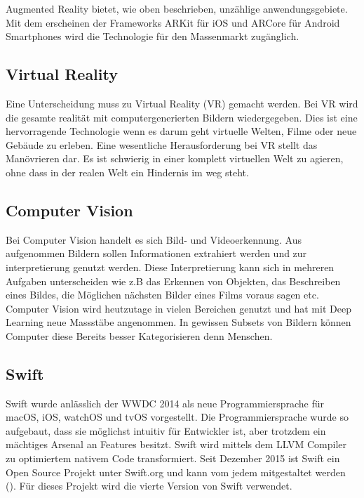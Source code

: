 Augmented Reality bietet, wie oben beschrieben, unzählige anwendungsgebiete. Mit dem erscheinen der Frameworks ARKit für iOS und ARCore für Android Smartphones wird die Technologie für den Massenmarkt zugänglich.

\subsection{Virtual Reality} \label{sub:virtual-reality}
Eine Unterscheidung muss zu Virtual Reality (VR) gemacht werden. Bei VR wird die gesamte realität mit computergenerierten Bildern wiedergegeben. Dies ist eine hervorragende Technologie wenn es darum geht virtuelle Welten, Filme oder neue Gebäude zu erleben. Eine wesentliche Herausforderung bei VR stellt das Manövrieren dar. Es ist schwierig in einer komplett virtuellen Welt zu agieren, ohne dass in der realen Welt ein Hindernis im weg steht.

\subsection{Computer Vision} \label{sub:computer-vision}
Bei Computer Vision handelt es sich Bild- und Videoerkennung. Aus aufgenommen Bildern sollen Informationen extrahiert werden und zur interpretierung genutzt werden. Diese Interpretierung kann sich in mehreren Aufgaben unterscheiden wie z.B das Erkennen von Objekten, das Beschreiben eines Bildes, die Möglichen nächsten Bilder eines Films voraus sagen etc. Computer Vision wird heutzutage in vielen Bereichen genutzt und hat mit Deep Learning neue Massstäbe angenommen. In gewissen Subsets von Bildern können Computer diese Bereits besser Kategorisieren denn Menschen.

\subsection{Swift} \label{sub:swift}
Swift wurde anlässlich der WWDC 2014 als neue Programmiersprache für macOS, iOS, watchOS und tvOS vorgestellt. Die Programmiersprache wurde so aufgebaut, dass sie möglichst intuitiv für Entwickler ist, aber trotzdem ein mächtiges Arsenal an Features besitzt. Swift wird mittels dem LLVM Compiler zu optimiertem nativem Code transformiert. Seit Dezember 2015 ist Swift ein Open Source Projekt unter Swift.org und kann vom jedem mitgestaltet werden (\cite{swift-org}). Für dieses Projekt wird die vierte Version von Swift verwendet.


